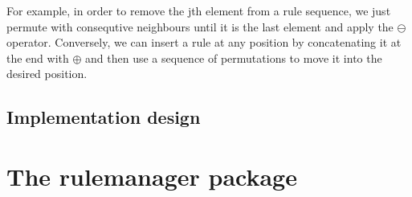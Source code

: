 \documentclass[a4paper,11pt]{style/uneceart}
\begin{document}
For example, in order to remove the jth element from a rule
sequence, we just permute with consequtive neighbours until it is the last
element and apply the $\ominus$ operator. Conversely, we can insert a rule at
any position by concatenating it at the end with $\oplus$ and then use a
sequence of permutations to move it into the desired position.




\subsection{Implementation design} \label{sc:B}



\section{The rulemanager package}





\end{document}
